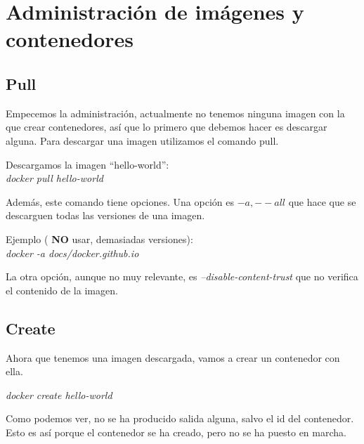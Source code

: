 \documentclass[]{article}
\begin{document}
\section{Administración de imágenes y contenedores}

\subsection{Pull}

Empecemos la administración, actualmente no tenemos ninguna imagen con la que crear contenedores, así que lo primero que debemos hacer es descargar alguna.
Para descargar una imagen utilizamos el comando pull.

\begin{center}
	
	Descargamos la imagen ``hello-world'':
	\vspace{1mm}
	\\
	\em docker pull hello-world
	
\end{center}

Además, este comando tiene opciones.
Una opción es $ -a,--all $ que hace que se descarguen todas las versiones de una imagen.

\begin{center}
Ejemplo  ( {\bf NO} usar, demasiadas versiones): 
\\
\vspace{1mm}
\em docker -a docs/docker.github.io

\end{center}

La otra opción, aunque no muy relevante, es  {\it --disable-content-trust }  que no verifica el contenido de la imagen.


\subsection{Create}

Ahora que tenemos una imagen descargada, vamos a crear un contenedor con ella.

\begin{center}

	\it
	docker create hello-world

\end{center}

Como podemos ver, no se ha producido salida alguna, salvo el id del contenedor.
Esto es así porque el contenedor se ha creado, pero no se ha puesto en marcha.
\end{document}
